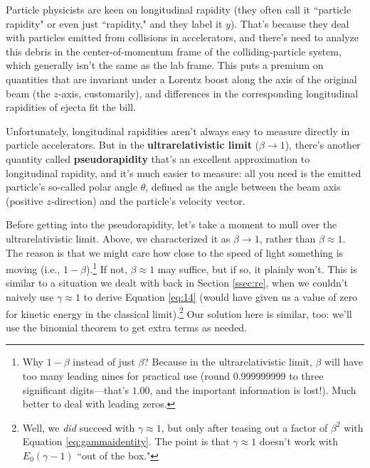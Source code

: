 \documentclass[12pt]{article}
\begin{document}
Particle physicists are keen on longitudinal rapidity (they often call it ``particle rapidity" or even just ``rapidity," and they label it $y$). That's because they deal with particles emitted from collisions in accelerators, and there's need to analyze this debris in the center-of-momentum frame of the colliding-particle system, which generally isn't the same as the lab frame. This puts a premium on quantities that are invariant under a Lorentz boost along the axis of the original beam (the $z$-axis, customarily), and differences in the corresponding longitudinal rapidities of ejecta fit the bill.

Unfortunately, longitudinal rapidities aren't always easy to measure directly in particle accelerators. But in the \textbf{ultrarelativistic limit} ($\beta \rightarrow 1$), there's another quantity called \textbf{pseudorapidity} that's an excellent approximation to longitudinal rapidity, and it's much easier to measure: all you need is the emitted particle's so-called polar angle $\theta$, defined as the angle between the beam axis (positive $z$-direction) and the particle's velocity vector.

Before getting into the pseudorapidity, let's take a moment to mull over the ultrarelativistic limit. Above, we characterized it as $\beta \rightarrow 1$, rather than $\beta \approx 1$. The reason is that we might care how close to the speed of light something is moving (i.e., $1 - \beta$).\footnote{Why $1 - \beta$ instead of just $\beta$? Because in the ultrarelativistic limit, $\beta$ will have too many leading nines for practical use (round 0.999999999 to three significant digits---that's $1.00$, and the important information is lost!). Much better to deal with leading zeros.} If not, $\beta \approx 1$ may suffice, but if so, it plainly won't. This is similar to a situation we dealt with back in Section \ref{ssec:re}, when we couldn't naively use $\gamma \approx 1$ to derive Equation \ref{eq:14} (would have given us a value of zero for kinetic energy in the classical limit).\footnote{Well, we \emph{did} succeed with $\gamma \approx 1$, but only after teasing out a factor of $\beta^2$ with Equation \ref{eq:gammaidentity}. The point is that $\gamma \approx 1$ doesn't work with $E_0 (\gamma - 1)$ ``out of the box."} Our solution here is similar, too: we'll use the binomial theorem to get extra terms as needed.
\end{document}
